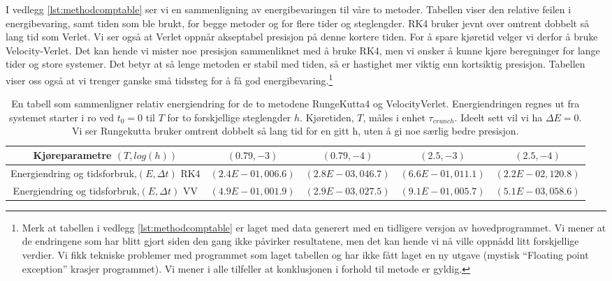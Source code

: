 \documentclass[11pt]{article}
\begin{document}
\begin{multicols}{2}
I vedlegg \ref{lst:methodcomptable} ser vi en sammenligning av energibevaringen til 
våre to metoder. Tabellen viser den relative feilen i energibevaring,
samt tiden som ble brukt, for begge metoder og for flere tider og
steglengder. RK4 bruker jevnt over omtrent dobbelt så lang tid
som Verlet. Vi ser også at Verlet oppnår akseptabel presisjon på denne
kortere tiden. For å spare kjøretid velger vi derfor å bruke 
Velocity-Verlet. Det kan hende vi mister noe presisjon sammenliknet med
å bruke RK4, men vi ønsker å kunne kjøre beregninger for lange tider
og store systemer. Det betyr at så lenge metoden er stabil med tiden,
så er hastighet mer viktig enn kortsiktig presisjon. Tabellen viser
oss også at vi trenger ganske små tidssteg for å få god
energibevaring.\footnote{Merk at tabellen i vedlegg
  \ref{lst:methodcomptable} er laget med data generert med en
  tidligere versjon av hovedprogrammet. Vi mener at de endringene som
  har blitt gjort siden den gang ikke påvirker resultatene, men det
  kan hende vi nå ville oppnådd litt forskjellige verdier. Vi fikk
  tekniske problemer med programmet som laget tabellen og har ikke
  fått laget en ny utgave (mystisk ``Floating point exception''
  krasjer programmet). Vi mener i alle tilfeller at konklusjonen i
  forhold til metode er gyldig.}

\end{multicols}

\begin{table}[h]
\centering
\caption{En tabell som sammenligner relativ energiendring for de to metodene
RungeKutta4 og VelocityVerlet. Energiendringen regnes ut fra systemet starter
i ro ved $t_0 = 0$ til $T$ for to forskjellige steglengder
$h$.  Kjøretiden, $T$, måles i enhet $\tau_{crunch}$. Ideelt sett vil vi ha $\Delta E = 0$. Vi ser Rungekutta bruker omtrent dobbelt så lang tid for en gitt h,
uten å gi noe særlig bedre presisjon.}
\label{tab:RKvsVV}
\vspace{0.5cm}
\begin{tabular}{ccccc}
Kjøreparametre $(T, log(h))$ & $(0.79,-3)$ & $(0.79,-4)$ & $(2.5,-3)$ & $(2.5,-4)$ \\
\hline 
Energiendring og tidsforbruk,$(E,\Delta t)$ RK4 & $(2.4E-01, 006.6)$ & $(2.8E-03, 046.7)$ & $(6.6E-01, 011.1)$ & $(2.2E-02, 120.8)$ \\
Energiendring og tidsforbruk,$(E,\Delta t)$ VV & $(4.9E-01, 001.9)$ & $(2.9E-03, 027.5)$ & $(9.1E-01, 005.7)$ & $(5.1E-03, 058.6)$ \\
\hline
\end{tabular}
\end{table}
\end{document}

